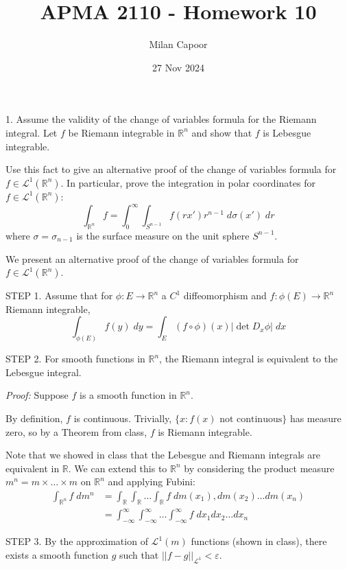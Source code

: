 \documentclass[12pt]{article}
\title{APMA 2110 - Homework 10}
\author{Milan Capoor}
\date{27 Nov 2024}
\newcommand{\R}{\mathbb{R}}
\newcommand{\abs}[1]{\left\vert #1 \right\vert}
\newcommand{\ep}{\varepsilon}
\renewcommand{\L}{\mathcal{L}}
\newenvironment*{proof}[1][blue]{
\begin{tcolorbox}[
    parbox=false,
    colback=#1!5!white,
    colframe=#1!75!black,
    breakable
]}
{\end{tcolorbox}}
\begin{document}
\maketitle

1. Assume the validity of the change of variables formula for the Riemann integral. Let $f$ be Riemann integrable in $\R^n$ and show that $f$ is Lebesgue integrable. 

Use this fact to give an alternative proof of the change of variables formula for $f \in \L^1(\R^n)$. In particular, prove the integration in polar coordinates for $f\in \L^1(\R^n)$:
\[\int_{\R^n} f = \int_0^{\infty} \int_{S^{n-1}} f(rx') r^{n-1} \;d\sigma(x') \; dr\] 
where $\sigma = \sigma_{n-1}$ is the surface measure on the unit sphere $S^{n-1}$.

    \color{blue}
        We present an alternative proof of the change of variables formula for $f \in \L^1(\R^n)$.

        STEP 1. Assume that for $\phi: E \to \R^n$ a $C^1$ diffeomorphism and $f: \phi(E) \to \R^n$ Riemann integrable,  
        \[\int_{\phi(E)} f(y)\; dy = \int_{E} (f\circ \phi)(x) \abs{\det D_x\phi} \; dx\]

        STEP 2. For smooth functions in $\R^n$, the Riemann integral is equivalent to the Lebesgue integral.

        \begin{proof}

            \emph{Proof:} Suppose $f$ is a smooth function in $\R^n$.

            By definition, $f$ is continuous. Trivially, $\{x: f(x) \text{ not continuous}\}$ has measure zero, so by a Theorem from class, $f$ is Riemann integrable. 

            Note that we showed in class that the Lebesgue and Riemann integrals are equivalent in $\R$. We can extend this to $\R^n$ by considering the product measure $m^n = m \times \dots \times m$ on $\R^n$ and applying Fubini: 
            \begin{align*}
                \int_{\R^n} f\; dm^n &= \int_{\R} \int_{\R} \dots\int_{\R} f \;dm(x_1), dm(x_2)\dots dm(x_n)\\ 
                &= \int_{-\infty}^{\infty} \int_{-\infty}^{\infty} \dots \int_{-\infty}^{\infty} f \;dx_1 dx_2 \dots dx_n
            \end{align*}
            
        \end{proof}

        STEP 3. By the approximation of $\L^1(m)$ functions (shown in class), there exists a smooth function $g$ such that $\abs{\abs{f - g}}_{\L^1} < \ep$.
\end{document}
